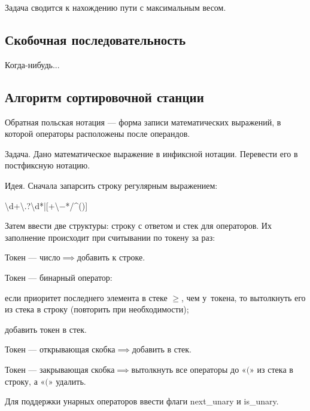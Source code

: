 Задача сводится к нахождению пути с {\ital максимальным весом}.

\subsection{Скобочная последовательность}

Когда-нибудь...

\newpage
\subsection{Алгоритм сортировочной станции}

{\bold Обратная польская нотация} --- форма записи математических выражений, в которой операторы расположены {\ital после} операндов.

\begin{theorem}
{\bold Задача.} Дано математическое выражение в инфиксной нотации. Перевести его в постфиксную нотацию.
\end{theorem}

{\bold Идея.} Сначала запарсить строку {\ital регулярным выражением}:

{\centering \textbackslash d+\textbackslash.?\textbackslash d*|[+\textbackslash$-$*/\^{}()]\par}
Затем ввести две структуры: {\ital строку} с ответом и {\ital стек} для операторов. Их заполнение происходит при считывании по токену за раз:
\begin{list*}[][\#]
\item Токен --- {\ital число}$\implies$добавить к строке.
\item Токен --- {\ital бинарный оператор}:
\begin{list*}[2]
\item если приоритет последнего элемента в стеке $\geq$, чем у~токена, то вытолкнуть его из стека в строку {\ital\color{desc} (повторить при необходимости)};
\item добавить токен в стек.
\end{list*}
\item Токен --- {\ital открывающая скобка}$\implies$добавить в стек.
\item Токен --- {\ital закрывающая скобка}$\implies$вытолкнуть все операторы до «$($» из стека в строку, а «$($» удалить.  
\end{list*}
Для поддержки унарных операторов ввести флаги {\ital next\_unary} и {\ital is\_unary}.
